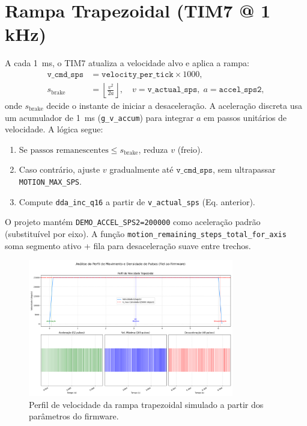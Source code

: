 \FloatBarrier
\section{Rampa Trapezoidal (TIM7 @ 1\,kHz)}
\label{sec:rampa}

A cada \SI{1}{ms}, o TIM7 atualiza a velocidade alvo e aplica a rampa:
\begin{align*}
  \texttt{v\_cmd\_sps} &= \texttt{velocity\_per\_tick}\times 1000, \\
  s_{\text{brake}} &= \left\lfloor \frac{v^2}{2a} \right\rfloor, \quad v=\texttt{v\_actual\_sps},\; a=\texttt{accel\_sps2},
\end{align*}
onde $s_{\text{brake}}$ decide o instante de iniciar a desacelera\c{c}\~ao.
A acelera\c{c}\~ao discreta usa um acumulador de \SI{1}{ms} (\texttt{g\_v\_accum}) para integrar $a$ em passos unit\'arios de velocidade. A l\'ogica segue:
\begin{enumerate}
  \item Se $\text{passos remanescentes} \le s_{\text{brake}}$, reduza $v$ (freio).
  \item Caso contr\'ario, ajuste $v$ gradualmente at\'e $\texttt{v\_cmd\_sps}$, sem ultrapassar \texttt{MOTION\_MAX\_SPS}.
  \item Compute \texttt{dda\_inc\_q16} a partir de \texttt{v\_actual\_sps} (Eq. anterior).
\end{enumerate}
O projeto mant\'em \texttt{DEMO\_ACCEL\_SPS2=\num{200000}} como acelera\c{c}\~ao padr\~ao (substitu\'ivel por eixo). A fun\c{c}\~ao \texttt{motion\_remaining\_steps\_total\_for\_axis} soma segmento ativo + fila para desacelera\c{c}\~ao suave entre trechos.

\begin{figure}[H]
  \centering
  \includegraphics[width=0.8\textwidth]{Cap03/rampa_trapezoidal.png}
  \caption{Perfil de velocidade da rampa trapezoidal simulado a partir dos parâmetros do firmware.}
  \label{fig:rampa_trapezoidal_simulada}
\end{figure}

